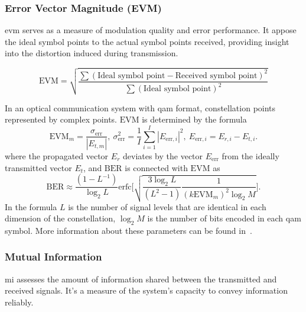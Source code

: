 \subsubsection{Error Vector Magnitude (EVM)}
\acrfull{evm} serves as a measure of modulation quality and error performance. It appose the ideal symbol points to the actual symbol points received, providing insight into the distortion induced during transmission.

\begin{equation}
\text{EVM} = \sqrt{\frac{\sum \left(\text{Ideal symbol point} - \text{Received symbol point}\right)^2}{\sum \left(\text{Ideal symbol point}\right)^2}}
\end{equation}

In an optical communication system with \Gls{qam} format, constellation points represented by complex points. $\mathrm{EVM}$ is determined by the formula
\begin{equation}
    \mathrm{EVM}_{m} = \frac{\sigma_{\mathrm{err}}}{|E_{t,m}|} {,} \
    \sigma_{\mathrm{err}}^2 = \frac{1}{I} \sum_{i=1}^{I} |E_{\mathrm{err},i}|^2 {,} \
    E_{\mathrm{err},i} = E_{r,i} - E_{t,i} {.}
\end{equation}
where the propagated vector $E_{r}$ deviates by the vector $E_{\mathrm{err}}$ from the ideally transmitted vector $E_{t}$, and $\mathrm{BER}$ is connected with $\mathrm{EVM}$ as
\begin{equation}
    \mathrm{BER} \approx \frac{(1 - L^{-1})}{\log_2 L}
        \mathrm{erfc}\bigg[ \sqrt{\frac{3 \log_2 L}{(L^2 - 1)} 
        \frac{1}{(k \mathrm{EVM}_{m})^2 \log_2 M}} \bigg] {.}
\end{equation}
In the formula $L$ is the number of signal levels that are identical in each dimension of the constellation, $\log_2 M$ is the number of bits encoded in each \Gls{qam} symbol. More information about these parameters can be found in~\cite{schmogrow}.



\subsubsection{Mutual Information}
\gls{mi} assesses the amount of information shared between the transmitted and received signals. It's a measure of the system's capacity to convey information reliably.

